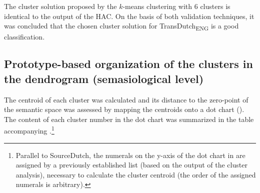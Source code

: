 The cluster solution proposed by the $k$-means clustering with 6 clusters is identical to the output of the HAC. On the basis of both validation techniques, it was concluded that the chosen cluster solution for TransDutch\textsubscript{ENG} is a good classification.

\subsection{Prototype-based organization of the clusters in the dendrogram (semasiological level)}
\label{sec:4.3.2}  
The centroid of each cluster was calculated and its distance to the zero-point of the semantic space was assessed by mapping the centroids onto a dot chart (). The content of each cluster number in the dot chart was summarized in the table accompanying .\footnote{Parallel to SourceDutch, the numerals on the y-axis of the dot chart in  are assigned by a previously established list (based on the output of the cluster analysis), necessary to calculate the cluster centroid (the order of the assigned numerals is arbitrary).}

